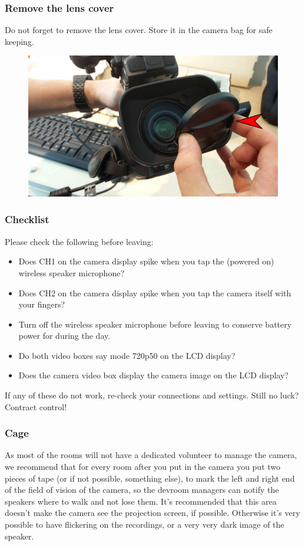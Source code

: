 \documentclass{article}
\begin{document}
\subsubsection{Remove the lens cover}
Do not forget to remove the lens cover. Store it in the camera bag for safe keeping.

\begin{figure}[H]
  \centering
\includegraphics[width = 120mm]{Canon07.jpg}
\end{figure}

\subsubsection{Checklist}
Please check the following before leaving:
\begin{itemize}
  \item Does CH1 on the camera display spike when you tap the (powered on) wireless speaker microphone?
  \item Does CH2 on the camera display spike when you tap the camera itself with your fingers?
  \item Turn off the wireless speaker microphone before leaving to conserve battery power for during the day.
  \item Do both video boxes say mode 720p50 on the LCD display?
  \item Does the camera video box display the camera image on the LCD display?
\end{itemize}

If any of these do not work, re-check your connections and settings. Still no luck? Contract control!

\subsubsection{Cage}

As most of the rooms will not have a dedicated volunteer to manage the camera, we recommend that for every room after you put in the camera you put two pieces of tape (or if not possible, something else), to mark the left and right end of the field of vision of the camera, so the devroom managers can notify the speakers where to walk and not lose them. It's recommended that this area doesn't make the camera see the projection screen, if possible. Otherwise it's very possible to have flickering on the recordings, or a very very dark image of the speaker.
\end{document}
